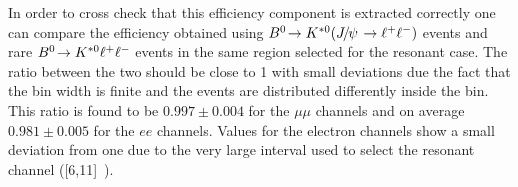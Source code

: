In order to cross check that this efficiency component is extracted correctly
one can compare the efficiency obtained using $\decay{\Bz}{\Kstarz(\jpsi\to\ll)}$ events
and rare ${{B}^0}\!\rightarrow {\ensuremath{{K}^{*0}}} \ell^+ \ell^-$ events in the same \qsq region selected
for the resonant case. The ratio between the two should be close to 1 with
small deviations due the fact that the bin width is finite and the events are distributed
differently inside the bin. This ratio is found to be $ 0.997  \pm  0.004 $ for the
$\mu\mu$ channels and on average $0.981  \pm  0.005$ for the $ee$ channels.
Values for the electron channels show a small deviation from one due to the very large
\qsq interval used to select the resonant channel ([6,11]~\gevgevcccc).



\clearpage








